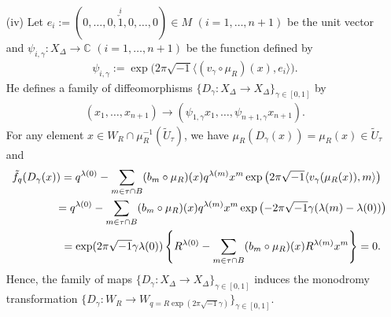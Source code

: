 \documentclass[10pt,a4paper]{amsart}
\numberwithin{equation}{section}
\begin{document}
\begin{enumerate}
The region surrounded by the center part of the tropical hypersurface coincides with
\begin{gather*}
\big\{ n \in N_{\mathbb R} \,|\, \lambda(0) \geq \langle m, n \rangle + \lambda(m) \ \mathrm{for\ any\ vertex} \ m \ \mathrm{in} \ T \big\}.
\end{gather*}
Hence when we set $\gamma=1$, the boundary of the convex polytope $\Delta_{\gamma=1}^\vee$ coincides with the center part of the tropical hypersurface.
For each $k$-dimensional simplex $\tau \in \partial T$, we def\/ine an $(n-k)$-dimensional face $\tau^\vee$ of $\Delta_\gamma^\vee$ by
\begin{gather*}
\tau^\vee:=\big\{ n \in \Delta_\gamma^\vee \,|\, {-}\langle n, m \rangle = \gamma (\lambda(m) - \lambda(0)) \ \mathrm{for\ any\ vertex} \ m \ \mathrm{in} \ \tau \big\}.
\end{gather*}
There is a bijective correspondence between simplices in~$\partial T$ and faces of $\Delta_\gamma^\vee$ given by $\tau \leftrightarrow \tau^\vee$.
Then he constructs a family of maps $\{v_\gamma \colon \Delta^\circ \to \partial \Delta_\gamma^\vee \}_{\gamma \in [0,1]}$ which depends on~$\gamma$ smoothly and satisf\/ies $v_\gamma(\widetilde{U}_\tau) \subset \tau^\vee$ for any $\tau \in \partial T$.

\item[(iv)]
Let $e_i:=(0,\dots,0,\overset{i}{\check{1}},0,\dots,0) \in M$ $(i=1, \dots, n+1)$ be the unit vector
and $\psi_{i,\gamma} \colon X_\Delta \to {\mathbb C}$ $(i=1, \dots, n+1)$ be the function def\/ined by
\begin{gather*}
\psi_{i,\gamma}:=\exp \big( 2 \pi \sqrt{-1} \langle (v_\gamma \circ \mu_R )(x), e_i \rangle \big).
\end{gather*}
He def\/ines a family of dif\/feomorphisms $\{ D_\gamma \colon X_\Delta \to X_\Delta \}_{\gamma \in [0,1]}$ by
\begin{gather}\label{eq:d1}
(x_{1}, \dots, x_{n+1}) \to (\psi_{1,\gamma} x_1, \dots, \psi_{n+1,\gamma} x_{n+1}).
\end{gather}
For any element $x \in W_R \cap \mu_R^{-1}(\widetilde{U}_\tau)$, we have $\mu_R(D_\gamma(x))=\mu_R(x) \in \widetilde{U}_\tau$ and
\begin{gather*}
\tilde{f}_q(D_\gamma(x)) =q^{\lambda(0)}-\sum_{m \in \tau \cap B}(b_m \circ \mu_R)(x)q^{\lambda(m)}x^m \exp \big( 2 \pi \sqrt{-1} \langle v_\gamma (\mu_R(x)), m\rangle \big) \\
\hphantom{\tilde{f}_q(D_\gamma(x))}{}
=q^{\lambda(0)}-\sum_{m \in \tau \cap B}(b_m \circ \mu_R)(x)q^{\lambda(m)}x^m \exp \big( {-}2 \pi \sqrt{-1} \gamma ( \lambda(m) - \lambda(0)) \big)\\
\hphantom{\tilde{f}_q(D_\gamma(x))}{}
 =\exp(2 \pi \sqrt{-1} \gamma \lambda(0)) \left\{ R^{\lambda(0)}-\sum_{m \in \tau \cap B}(b_m \circ \mu_R)(x)R^{\lambda(m)}{x}^m \right\}=0 .
\end{gather*}
Hence, the family of maps $\{D_\gamma \colon X_\Delta \to X_\Delta \}_{\gamma \in [0,1]}$ induces the monodromy transformation $\big\{ D_\gamma \colon W_R \to W_{q=R\exp (2 \pi \sqrt{-1} \gamma)} \big\}_{\gamma \in [0,1]}$.
\end{enumerate}
\end{document}
